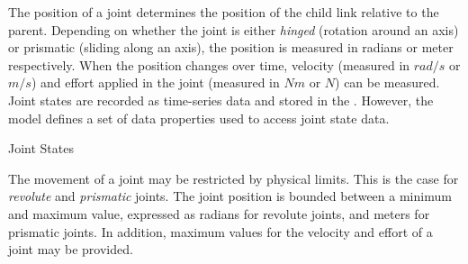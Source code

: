 The position of a joint determines the position of the child link relative to the parent.
Depending on whether the joint is either \emph{hinged} (rotation around an axis) or prismatic (sliding along an axis), the position is measured in radians or meter respectively.
When the position changes over time, velocity (measured in $rad/s$ or $m/s$) and effort applied in the joint (measured in $Nm$ or $N$) can be measured.
Joint states are recorded as time-series data and stored in the \neemexp.
However, the \neem model defines a set of data properties used to access joint state data.

\begin{ODP}{Joint States}
\end{ODP}

The movement of a joint may be restricted by physical limits.
This is the case for \emph{revolute} and \emph{prismatic} joints.
The joint position is bounded between a minimum and maximum value, expressed as radians for revolute joints, and meters for prismatic joints.
In addition, maximum values for the velocity and effort of a joint may be provided.

